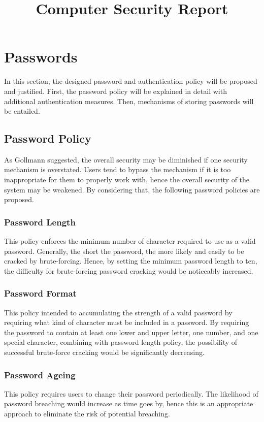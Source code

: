 \documentclass{article}
\title{Computer Security Report}
\begin{document}
%
\maketitle
%

\section{Passwords}
\label{sec:passwd}
In this section, the designed password and authentication policy will be proposed and justified.
First, the password policy will be explained in detail with additional authentication measures.
Then, mechanisms of storing passwords will be entailed.

\subsection{Password Policy}
As Gollmann \cite{GollmannDieter2011Cs/D}suggested, the overall security may be diminished 
if one security mechanism is overstated. Users tend to bypass the mechanism if it is too 
inappropriate for them to properly work with, hence the overall security of the system 
may be weakened. By considering that, the following password policies are proposed.

\subsubsection{Password Length}
This policy enforces the minimum number of character required to use as a valid password. 
Generally, the short the password, the more likely and easily to be cracked by brute-forcing.
Hence, by setting the minimum password length to ten, the difficulty for brute-forcing password 
cracking would be noticeably increased.

\subsubsection{Password Format}
This policy intended to accumulating the strength of a valid password by requiring what kind 
of character must be included in a password. By requiring the password to contain 
at least one lower and upper letter, one number, and one special character, combining with 
password length policy, the possibility of successful brute-force cracking would 
be significantly decreasing.

\subsubsection{Password Ageing}
This policy requires users to change their password periodically. The likelihood of password 
breaching would increase as time goes by, hence this is an appropriate approach to eliminate the 
risk of potential breaching.
\end{document}
